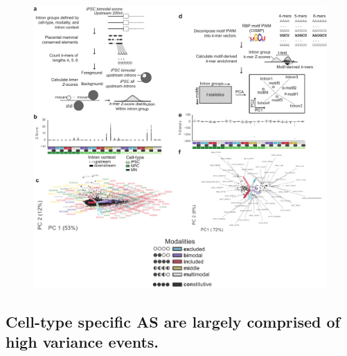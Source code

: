 \begin{figure}[h]
\ContinuedFloat
\captionsetup{labelformat=empty}
\centering
\includegraphics[width=5.8in]{figures/modality_features_supplementary_part2.pdf}
\end{figure}
\addtocounter{figure}{1}
\clearpage



\subsection{Cell-type specific AS are largely comprised of high variance events.}

